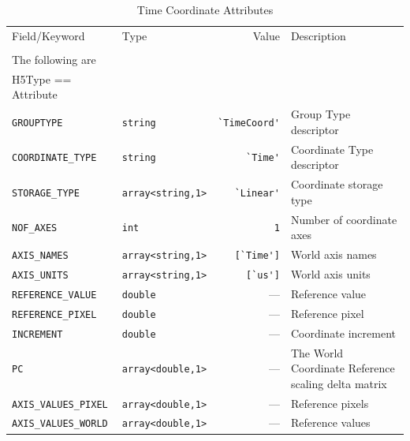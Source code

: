 \documentclass[a4paper,10pt,bibtotoc]{scrartcl}
\begin{document}
\begin{table}[hp]
\begin{center}
  \begin{tabular}{|llrp{4cm}|}
    \hline
    \sc Field/Keyword  & \sc Type & \sc Value & Description \\
    \sc   & \sc & \sc & \\
    \hline \hline
    \sc The following are & \sc & \sc & \\
    \sc H5Type == Attribute & \sc & \sc & \\
    \hline 
    \small{\verb|GROUPTYPE|} & \verb|string| & \verb|`TimeCoord'| & Group Type descriptor \\
    \small{\verb|COORDINATE_TYPE|} & \verb|string| & \verb|`Time'| & Coordinate Type descriptor \\
    \small{\verb|STORAGE_TYPE|} & \small\verb|array<string,1>| & \verb|`Linear'| & Coordinate storage type \\
    \small{\verb|NOF_AXES|}  & \verb|int| & \verb|1| & Number of coordinate axes \\
    \small{\verb|AXIS_NAMES|}  & \verb|array<string,1>| & \verb|[`Time']| & World axis names \\
    \small{\verb|AXIS_UNITS|}  & \verb|array<string,1>| & \verb|[`us']| & World axis units \\
    \small{\verb|REFERENCE_VALUE|}  & \verb|double| & --- & Reference value \\
    \small{\verb|REFERENCE_PIXEL|}  & \verb|double| & --- & Reference pixel \\
    \small{\verb|INCREMENT|}  & \verb|double| & --- & Coordinate increment \\
    \small{\verb|PC|}  & \verb|array<double,1>| & --- & The World Coordinate Reference scaling delta matrix \\
    \small{\verb|AXIS_VALUES_PIXEL|}  & \verb|array<double,1>| & --- & Reference pixels \\
    \small{\verb|AXIS_VALUES_WORLD|}  & \verb|array<double,1>| & --- & Reference values \\
    \hline
  \end{tabular}
  \caption{Time Coordinate Attributes}
  \label{tab:temporal coordinate}
\end{center}
\end{table}
\end{document}
